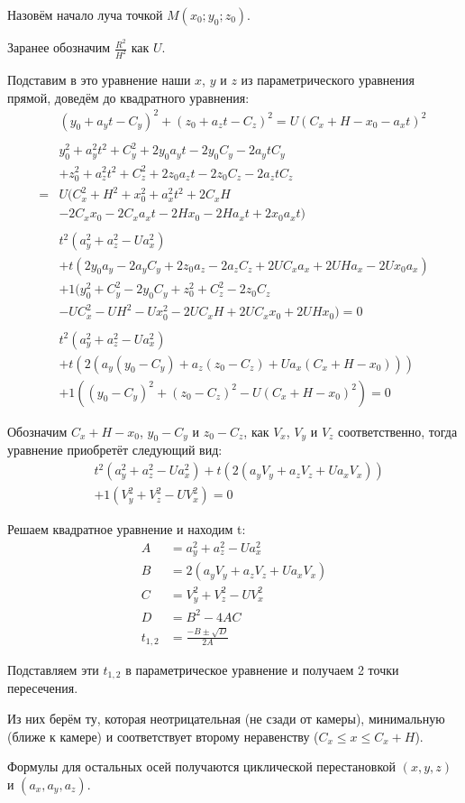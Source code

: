 \documentclass{article}
\begin{document}
	Назовём начало луча точкой $M(x_0;y_0;z_0)$.
	
	Заранее обозначим $\frac{R^2}{H^2}$ как $U$.
	
	Подставим в это уравнение наши $x$, $y$ и $z$ из параметрического уравнения
	прямой, доведём до квадратного уравнения:
	\begin{equation}
		\begin{split}
			&(y_0+a_yt-C_y)^2+(z_0+a_zt-C_z)^2=U(C_x+H-x_0-a_xt)^2\\\\
			&y_0^2+a_y^2t^2+C_y^2+2y_0a_yt-2y_0C_y-2a_ytC_y\\
			&+z_0^2+a_z^2t^2+C_z^2+2z_0a_zt-2z_0C_z-2a_ztC_z\\
			=&U(C_x^2+H^2+x_0^2+a_x^2t^2+2C_xH\\
			&-2C_xx_0-2C_xa_xt-2Hx_0-2Ha_xt+2x_0a_xt)\\\\
			&t^2(a_y^2+a_z^2-Ua_x^2)\\
			&+t(2y_0a_y-2a_yC_y+2z_0a_z-2a_zC_z+2UC_xa_x+2UHa_x-2Ux_0a_x)\\
			&+1(y_0^2+C_y^2-2y_0C_y+z_0^2+C_z^2-2z_0C_z\\
			&-UC_x^2-UH^2-Ux_0^2-2UC_xH+2UC_xx_0+2UHx_0)=0\\\\
			&t^2(a_y^2+a_z^2-Ua_x^2)\\
			&+t(2(a_y(y_0-C_y)+a_z(z_0-C_z)+Ua_x(C_x+H-x_0)))\\
			&+1((y_0-C_y)^2+(z_0-C_z)^2-U(C_x+H-x_0)^2)=0
		\end{split}
	\end{equation}
	
	Обозначим $C_x+H-x_0$, $y_0-C_y$ и $z_0-C_z$, как $V_x$, $V_y$ и $V_z$
	соответственно, тогда уравнение приобретёт следующий вид:
	\begin{equation}
		\begin{split}
			&t^2(a_y^2+a_z^2-Ua_x^2)+t(2(a_yV_y+a_zV_z+Ua_xV_x))\\
			&+1(V_y^2+V_z^2-UV_x^2)=0
		\end{split}
	\end{equation}
	
	Решаем квадратное уравнение и находим t:
	\begin{equation}
		\begin{split}
			A&=a_y^2+a_z^2-Ua_x^2\\
			B&=2(a_yV_y+a_zV_z+Ua_xV_x)\\
			C&=V_y^2+V_z^2-UV_x^2\\
			D&=B^2-4AC\\
			t_{1,2}&=\frac{-B\pm\sqrt{D}}{2A}
		\end{split}
	\end{equation}
	
	Подставляем эти $t_{1,2}$ в параметрическое уравнение и получаем 2 точки
	пересечения.
	
	Из них берём ту, которая неотрицательная (не сзади от камеры), минимальную
	(ближе к камере) и соответствует второму неравенству ($C_x\leq{}x\leq{}C_x+H$).
	
	Формулы для остальных осей получаются циклической перестановкой $(x,y,z)$ и
	$(a_x,a_y,a_z)$.
\end{document}

